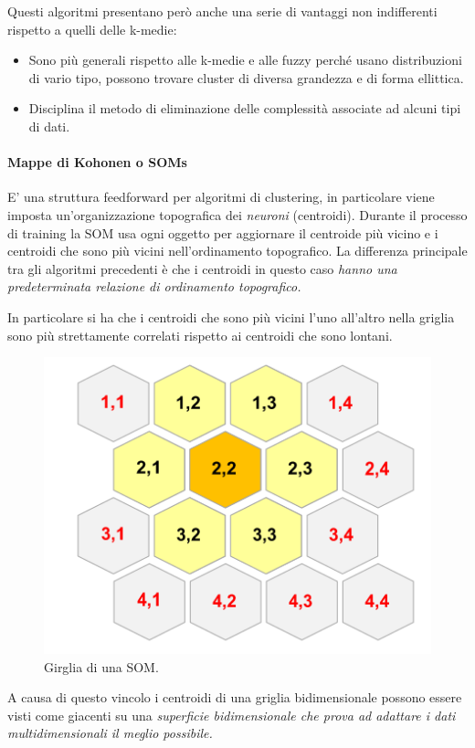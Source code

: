 Questi algoritmi presentano però anche una serie di vantaggi non indifferenti rispetto a quelli delle k-medie:
\begin{itemize}
	\item Sono più generali rispetto alle k-medie e alle fuzzy perché usano distribuzioni di vario tipo, possono trovare cluster di diversa grandezza e di forma ellittica.
	\item Disciplina il metodo di eliminazione delle complessità associate ad alcuni tipi di dati.
\end{itemize}

\paragraph{Mappe di Kohonen o SOMs}
E' una struttura feedforward per algoritmi di clustering, in particolare viene imposta un'organizzazione topografica dei \textit{neuroni} (centroidi). Durante il processo di training la SOM usa ogni oggetto per aggiornare il centroide più vicino e i centroidi che sono più vicini nell'ordinamento topografico.
La differenza principale tra gli algoritmi precedenti è che i centroidi in questo caso \textit{hanno una predeterminata relazione di ordinamento topografico.}

In particolare si ha che i centroidi che sono più vicini l'uno all'altro nella griglia sono più strettamente correlati rispetto ai centroidi che sono lontani.
\begin{figure}[H]
	\centering
	\includegraphics[height=0.3 \linewidth]{clustering/pict/som.png}
	\caption{Girglia di una SOM.}
\end{figure}

A causa di questo vincolo i centroidi di una griglia bidimensionale possono essere visti come giacenti su una \textit{superficie bidimensionale che prova ad adattare i dati multidimensionali il meglio possibile.}

